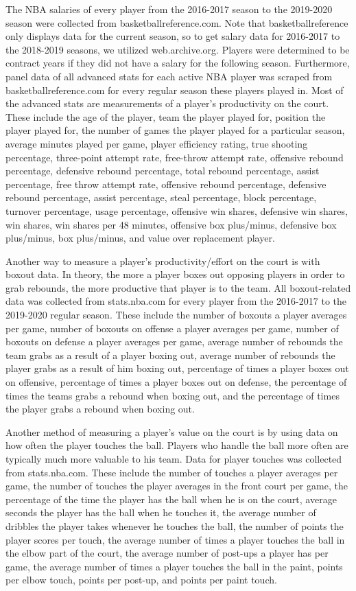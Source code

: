 \documentclass[12pt]{article}
\begin{document}
	The NBA salaries of every player from the 2016-2017 season to the 2019-2020 season were collected from basketballreference.com. Note that basketballreference only displays data for the current season, so to get salary data for 2016-2017 to the 2018-2019 seasons, we utilized web.archive.org. Players were determined to be contract years if they did not have a salary for the following season. Furthermore, panel data of all advanced stats for each active NBA player was scraped from basketballreference.com for every regular season these players played in. Most of the advanced stats are measurements of a player's productivity on the court. These include the age of the player, team the player played for, position the player played for, the number of games the player played for a particular season, average minutes played per game, player efficiency rating, true shooting percentage, three-point attempt rate, free-throw attempt rate, offensive rebound percentage, defensive rebound percentage, total rebound percentage, assist percentage, free throw attempt rate, offensive rebound percentage, defensive rebound percentage, assist percentage, steal percentage, block percentage, turnover percentage, usage percentage, offensive win shares, defensive win shares, win shares, win shares per 48 minutes, offensive box plus/minus, defensive box plus/minus, box plus/minus, and value over replacement player. 

	Another way to measure a player's productivity/effort on the court is with boxout data. In theory, the more a player boxes out opposing players in order to grab rebounds, the more productive that player is to the team. All boxout-related data was collected from stats.nba.com for every player from the 2016-2017 to the 2019-2020 regular season. These include the number of boxouts a player averages per game, number of boxouts on offense a player averages per game, number of boxouts on defense a player averages per game, average number of rebounds the team grabs as a result of a player boxing out, average number of rebounds the player grabs as a result of him boxing out, percentage of times a player boxes out on offensive, percentage of times a player boxes out on defense, the percentage of times the teams grabs a rebound when boxing out, and the percentage of times the player grabs a rebound when boxing out. 

	Another method of measuring a player's value on the court is by using data on how often the player touches the ball. Players who handle the ball more often are typically much more valuable to his team. Data for player touches was collected from stats.nba.com. These include the number of touches a player averages per game, the number of touches the player averages in the front court per game, the percentage of the time the player has the ball when he is on the court, average seconds the player has the ball when he touches it, the average number of dribbles the player takes whenever he touches the ball, the number of points the player scores per touch, the average number of times a player touches the ball in the elbow part of the court, the average number of post-ups a player has per game, the average number of times a player touches the ball in the paint, points per elbow touch, points per post-up, and points per paint touch. 
\end{document}
